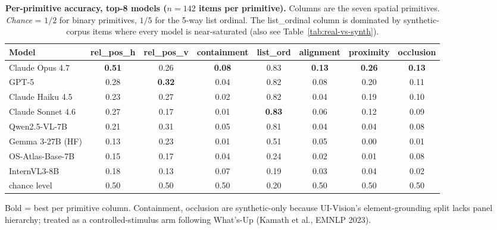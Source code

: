 \begin{table}[t]
\centering
\scriptsize
\begin{threeparttable}
\caption{\textbf{Per-primitive accuracy, top-8 models ($n{=}142$ items per primitive).}
Columns are the seven spatial primitives. \emph{Chance} = $1/2$ for binary
primitives, $1/5$ for the 5-way list ordinal. The list\_ordinal column is
dominated by synthetic-corpus items where every model is near-saturated
(also see Table~\ref{tab:real-vs-synth}).}
\label{tab:per-primitive}
\begin{tabular}{@{}lccccccc@{}}
\toprule
\textbf{Model} & \textbf{rel\_pos\_h} & \textbf{rel\_pos\_v} & \textbf{containment}
& \textbf{list\_ord} & \textbf{alignment} & \textbf{proximity} & \textbf{occlusion} \\
\midrule
Claude Opus 4.7   & \textbf{0.51} & 0.26 & \textbf{0.08} & 0.83          & \textbf{0.13} & \textbf{0.26} & \textbf{0.13} \\
GPT-5             & 0.28          & \textbf{0.32} & 0.04          & 0.82          & 0.08          & 0.20          & 0.11 \\
Claude Haiku 4.5  & 0.23          & 0.27 & 0.02          & 0.82          & 0.04          & 0.19          & 0.10 \\
Claude Sonnet 4.6 & 0.27          & 0.17 & 0.01          & \textbf{0.83} & 0.06          & 0.12          & 0.09 \\
Qwen2.5-VL-7B     & 0.21          & 0.31 & 0.05          & 0.81          & 0.04          & 0.04          & 0.08 \\
Gemma 3-27B (HF)  & 0.13          & 0.23 & 0.01          & 0.51          & 0.05          & 0.00          & 0.01 \\
OS-Atlas-Base-7B  & 0.15          & 0.17 & 0.04          & 0.24          & 0.02          & 0.01          & 0.08 \\
InternVL3-8B      & 0.18          & 0.13 & 0.07          & 0.19          & 0.03          & 0.04          & 0.02 \\
\midrule
chance level      & 0.50          & 0.50 & 0.50          & 0.20          & 0.50          & 0.50          & 0.50 \\
\bottomrule
\end{tabular}
\begin{tablenotes}
\footnotesize
\item Bold = best per primitive column. Containment, occlusion are
synthetic-only because UI-Vision's element-grounding split lacks panel
hierarchy; treated as a controlled-stimulus arm following What's-Up
(Kamath et al., EMNLP 2023).
\end{tablenotes}
\end{threeparttable}
\end{table}


